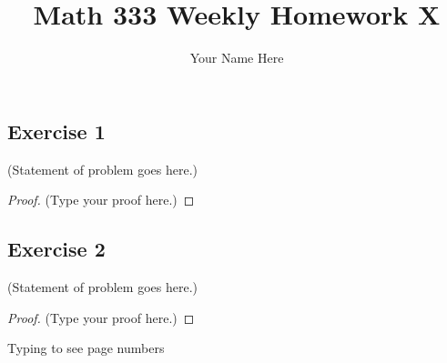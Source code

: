 \documentclass[12pt]{article}
\title{Math 333 Weekly Homework X}
\author{Your Name Here}
\begin{document}
\maketitle

\vspace{0.5in}



\subsection*{Exercise 1}
(Statement of problem goes here.)\\

\begin{proof}
(Type your proof here.)
\end{proof}

\vspace{2in} %


\subsection*{Exercise 2}
(Statement of problem goes here.)\\

\begin{proof}
(Type your proof here.)
\end{proof}

\vspace{2in} %

\vspace{3in}
Typing to see page numbers
\end{document}
